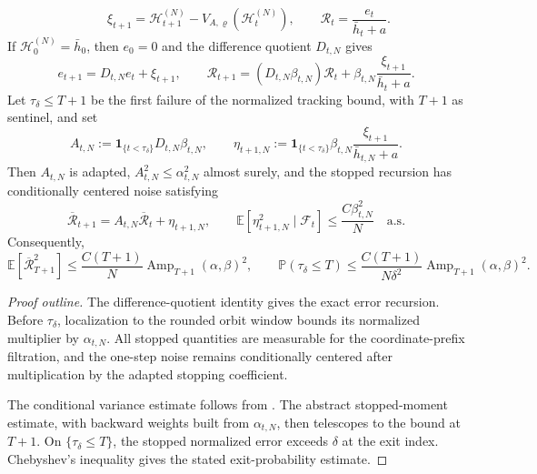 \begin{lemma}
\[    \qquad
    \xi_{t+1}=\mathscr H_{t+1}^{(N)}
      -V_{A,\varrho}(\mathscr H_t^{(N)}),
    \qquad
    \mathcal R_t=\frac{e_t}{\bar h_t+a}.
  \]
  If $\mathscr H_0^{(N)}=\bar h_0$, then $e_0=0$ and the difference quotient
  $D_{t,N}$ gives
  \[
    e_{t+1}=D_{t,N}e_t+\xi_{t+1},
    \qquad
    \mathcal R_{t+1}
      =(D_{t,N}\beta_{t,N})\mathcal R_t
        +\beta_{t,N}\frac{\xi_{t+1}}{\bar h_t+a}.
  \]
  Let $\tau_\delta\leq T+1$ be the first failure of the normalized tracking
  bound, with $T+1$ as sentinel, and set
  \[
    A_{t,N}:=\mathbf 1_{\{t<\tau_\delta\}}D_{t,N}\beta_{t,N},
    \qquad
    \eta_{t+1,N}:=
      \mathbf 1_{\{t<\tau_\delta\}}\beta_{t,N}
      \frac{\xi_{t+1}}{\bar h_{t,N}+a}.
  \]
  Then $A_{t,N}$ is adapted, $A_{t,N}^2\leq\alpha_{t,N}^2$ almost surely, and
  the stopped recursion has conditionally centered noise satisfying
  \[
    \overline{\mathcal R}_{t+1}
      =A_{t,N}\overline{\mathcal R}_t+\eta_{t+1,N},
    \qquad
    \mathbb E[\eta_{t+1,N}^2\mid\mathcal F_t]
      \leq \frac{C\beta_{t,N}^2}{N}
      \quad\text{a.s.}
  \]
  Consequently,
  \[
    \mathbb E[\overline{\mathcal R}_{T+1}^2]
      \leq \frac{C(T+1)}{N}
        \operatorname{Amp}_{T+1}(\alpha,\beta)^2,
    \qquad
    \mathbb P(\tau_\delta\leq T)
      \leq \frac{C(T+1)}{N\delta^2}
        \operatorname{Amp}_{T+1}(\alpha,\beta)^2.
  \]
\end{lemma}
\begin{proof}[Proof outline]
  \leanok
  The difference-quotient identity gives the exact error recursion. Before
  $\tau_\delta$, localization to the rounded orbit window bounds its normalized
  multiplier by $\alpha_{t,N}$. All stopped quantities are measurable for the
  coordinate-prefix filtration, and the one-step noise remains conditionally
  centered after multiplication by the adapted stopping coefficient.

  The conditional variance estimate follows from
  . The abstract stopped-moment
  estimate, with backward weights built from $\alpha_{t,N}$, then telescopes to
  the bound at $T+1$. On $\{\tau_\delta\leq T\}$, the stopped normalized error
  exceeds $\delta$ at the exit index. Chebyshev's inequality gives the stated
  exit-probability estimate.
\end{proof}

